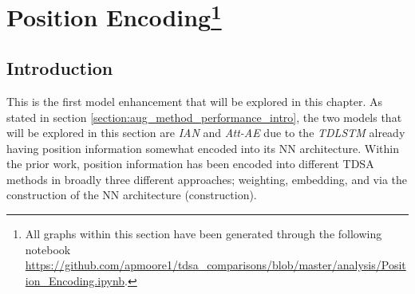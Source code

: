 \FloatBarrier
\section[Position Encoding]{Position Encoding\footnote{All graphs within this section have been generated through the following notebook \url{https://github.com/apmoore1/tdsa_comparisons/blob/master/analysis/Position_Encoding.ipynb}.}}
\label{section:aug_position_encoding}
\subsection{Introduction}
This is the first model enhancement that will be explored in this chapter. As stated in section \ref{section:aug_method_performance_intro}, the two models that will be explored in this section are \textit{IAN} and \textit{Att-AE} due to the \textit{TDLSTM} already having position information somewhat encoded into its NN architecture. Within the prior work, position information has been encoded into different TDSA methods in broadly three different approaches; weighting, embedding, and via the construction of the NN architecture (construction). 

